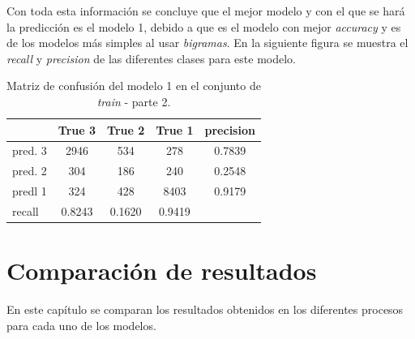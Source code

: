 \documentclass[es]{uc3mreport}
\begin{document}
\begin{report}
    Con toda esta información se concluye que el mejor modelo y con el que se
    hará la predicción es el modelo 1, debido a que es el modelo con mejor
    \textit{accuracy} y es de los modelos más simples al usar \textit{bigramas}.
    En la siguiente figura se muestra el \textit{recall} y \textit{precision} de
    las diferentes clases para este modelo.

\begin{table}[H]
\center
\begin{tabular}{@{}lccc|c@{}}
    \toprule
             & True 3 & True 2 & True 1 & precision\\
    \hline
    pred. 3  & 2946   & 534    & 278    & 0.7839   \\
    pred. 2  & 304    & 186    & 240    & 0.2548   \\
    predl 1  & 324    & 428    & 8403   & 0.9179   \\
    \hline
    recall   & 0.8243 & 0.1620 & 0.9419 &          \\
    \bottomrule
\end{tabular}
\caption{Matriz de confusión del modelo 1 en el conjunto de \textit{train} -
parte 2.}
\end{table}


\section{Comparación de resultados}
\label{chap:resultados}

En este capítulo se comparan los resultados obtenidos en los diferentes procesos para cada uno de los modelos.


\end{report}
\end{document}
